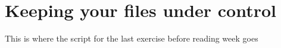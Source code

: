 \chapter[Version Control]{Keeping your files under control}
\minitoc
{}

\begin{note}
  This is where the script for the last exercise before reading week goes

\end{note}

